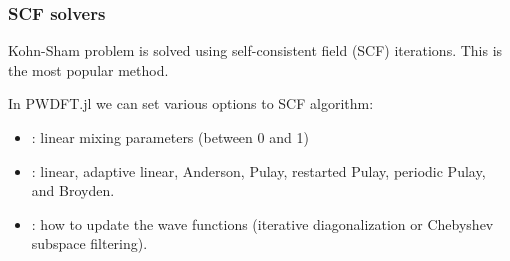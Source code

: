 \begin{frame}
\frametitle{SCF solvers}

Kohn-Sham problem is solved using self-consistent field (SCF) iterations.
This is the most popular method.

In PWDFT.jl we can set various options to SCF algorithm:

\begin{itemize}
\item {}: linear mixing parameters (between 0 and 1)
\item {}: linear, adaptive linear, Anderson, Pulay, restarted Pulay, periodic Pulay,
  and Broyden.
\item {}: how to update the wave functions (iterative diagonalization or Chebyshev
subspace filtering).
\end{itemize}


\end{frame}